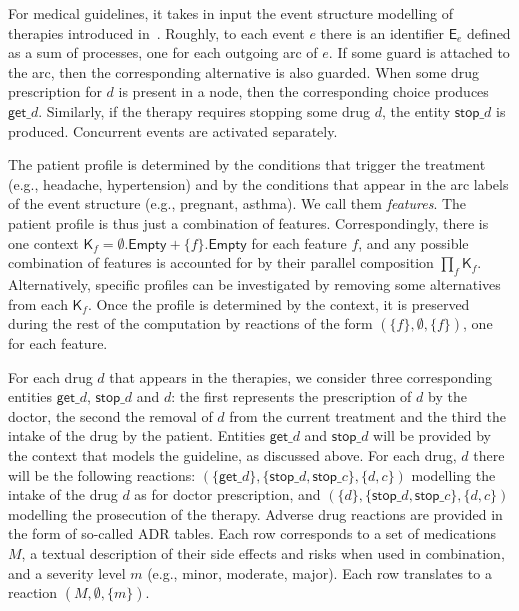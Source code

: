 For medical guidelines, it takes in input the event structure modelling of therapies introduced in~\cite{BC17c}. Roughly, to each event $e$ there is an identifier $\mathsf{E}_e$ defined as a sum of processes, one for each outgoing arc of $e$. If some guard is attached to the arc, then the corresponding alternative is also guarded. When some drug prescription for $d$ is present in a node, then the corresponding choice produces $\mathsf{get}\_d$. Similarly, if the therapy requires stopping some drug $d$, the entity $\mathsf{stop}\_d$ is produced.
Concurrent events are activated separately.

The patient profile is determined by the conditions that trigger the treatment (e.g., headache, hypertension) and by the conditions that appear in the arc labels of the event structure (e.g., pregnant, asthma). We call them \emph{features}. The patient profile is thus just a combination of features. Correspondingly, there is one context $\mathsf{K}_f = \emptyset.\mathsf{Empty} + \{f\}.\mathsf{Empty}$ for each feature $f$, and any possible combination of features is accounted for by their parallel composition $\prod_f \mathsf{K}_f$. Alternatively, specific profiles can be investigated by removing some alternatives from each $\mathsf{K}_f$.
Once the profile is determined by the context, it is preserved during the rest of the computation by reactions of the form $(\{f\},\emptyset,\{f\})$, one for each feature.

For each drug $d$ that appears in the therapies, we consider three corresponding entities $\mathsf{get}\_d$, $\mathsf{stop}\_d$  and $d$: the first represents the prescription of $d$ by the doctor, the second the removal of $d$ from the current treatment and the third the intake of the drug by the patient. 
Entities $\mathsf{get}\_d$ and $\mathsf{stop}\_d$ will be provided by the context that models the guideline, as discussed above. 
For each drug, $d$ there will be the following reactions: $(\{\mathsf{get}\_d\},\{\mathsf{stop}\_d,\mathsf{stop}\_c\},\{d,c\})$ modelling the intake of the drug $d$ as for doctor prescription, and $(\{d\},\{\mathsf{stop}\_d,\mathsf{stop}\_c\},\{d,c\})$ modelling the prosecution of the therapy.
Adverse drug reactions are provided in the form of so-called ADR tables.
Each row corresponds to a set of medications $M$, a textual description of their side effects and risks when used in combination, and a severity level $m$ (e.g., minor, moderate, major).
Each row translates to a reaction $(M,\emptyset,\{m\})$. 

